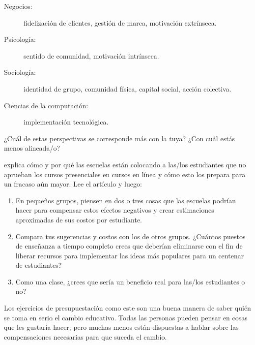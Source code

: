 \begin{description}

\item[Negocios:]
  fidelización de clientes, gestión de marca, motivación extrínseca.

\item[Psicología:]
  sentido de comunidad, motivación intrínseca.

\item[Sociología:]
  identidad de grupo, comunidad física, capital social, acción colectiva.

\item[Ciencias de la computación:]
  implementación tecnológica.

\end{description}

¿Cuál de estas perspectivas se corresponde más con la tuya?
¿Con cuál estás menos alineada/o?


explica cómo y por qué las escuelas están colocando a las/los estudiantes que no aprueban los cursos presenciales en cursos en línea
y cómo esto los prepara para un fracaso aún mayor.
Lee el artículo y luego:

\begin{enumerate}

\item
  En pequeños grupos,
  piensen en dos o tres cosas que las escuelas podrían hacer para compensar estos efectos negativos
  y crear estimaciones aproximadas de sus costos por estudiante.

\item
  Compara tus sugerencias y costos con los de otros grupos.
  ¿Cuántos puestos de enseñanza a tiempo completo crees que deberían eliminarse
  con el fin de liberar recursos para implementar las ideas más populares para un centenar de estudiantes?

\item
  Como una clase,
  ¿crees que sería un beneficio real para las/los estudiantes o no?

\end{enumerate}

Los ejercicios de presupuestación como este son una buena manera de saber quién se toma en serio el cambio educativo.
Todas las personas pueden pensar en cosas que les gustaría hacer;
pero muchas menos están dispuestas a hablar sobre las compensaciones necesarias para que suceda el cambio.
